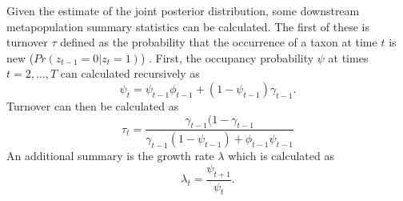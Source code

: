 \documentclass[12pt,letterpaper]{article}
\begin{document}
Given the estimate of the joint posterior distribution, some downstream metapopulation summary statistics can be calculated. The first of these is turnover \(\tau\) defined as the probability that the occurrence of a taxon at time \(t\) is new (\(Pr(z_{t - 1} = 0 | z_{t} = 1)\)) \citep{Royle2008}. First, the occupancy probability \(\psi\) at times \(t = 2, \dots, T\) can calculated recursively as
\begin{equation}
  \psi_{t} = \psi_{t - 1}\phi_{t - 1} + (1 - \psi_{t - 1})\gamma_{t - 1}.
\end{equation}
Turnover can then be calculated as
\begin{equation}
  \tau_{t} = \frac{\gamma_{t - 1} (1 - \gamma_{t - 1}}{\gamma_{t - 1} (1 - \psi_{t - 1}) + \phi_{t - 1} \psi_{t - 1}}
\end{equation}
An additional summary is the growth rate \(\lambda\) \citep{MacKenzie2003,Royle2008} which is calculated as
\begin{equation}
  \lambda_{t} = \frac{\psi_{t + 1}}{\psi_{t}}.
\end{equation}
\end{document}
